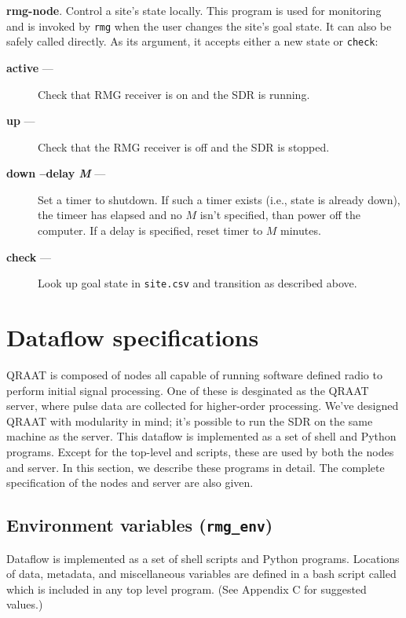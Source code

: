 \documentclass[letter]{article}
\begin{document}
\textbf{rmg-node}. Control a site's state locally. This program is used for monitoring 
and is invoked by \texttt{rmg} when the user changes the site's goal state. It can also be safely
called directly. As its argument, it accepts either a new state or \texttt{check}: 
\begin{description}
  \item[\quad \textbf{active} ---] Check that RMG receiver is on and the SDR is running. 
  \item[\quad \textbf{up} ---] Check that the RMG receiver is off and the SDR is stopped. 
  \item[\quad \textbf{down --delay \textit{M}} ---] Set a timer to shutdown. If such a timer 
    exists (i.e., state is already down), the timeer has elapsed and no $M$ isn't specified, than 
    power off the computer. If a delay is specified, reset timer to $M$ minutes. 
  \item[\quad \textbf{check} ---] Look up goal state in \texttt{site.csv} and transition
    as described above. 
\end{description}


\section{Dataflow specifications}
QRAAT is composed of nodes all capable of running software defined radio to perform
initial signal processing. One of these is desginated as the QRAAT server, where 
pulse data are collected for higher-order processing. We've designed QRAAT with 
modularity in mind; it's possible to run the SDR on the same machine as the server. 
This dataflow is implemented as a set of shell and Python programs. Except
for the top-level  and  scripts, these are used by 
both the nodes and server. In this section, we describe these programs in detail. 
The complete specification of the nodes and server are also given. 



\subsection{Environment variables (\texttt{rmg\_env})}
Dataflow is implemented as a set of shell scripts and Python programs. Locations of
data, metadata, and miscellaneous variables are defined in a bash script called 
 which is included in any top level program. (See Appendix C for 
suggested values.) 
\end{document}
